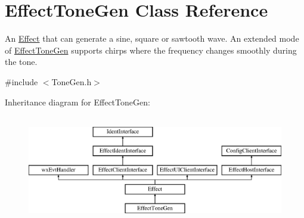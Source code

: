 \hypertarget{class_effect_tone_gen}{}\section{Effect\+Tone\+Gen Class Reference}
\label{class_effect_tone_gen}


An \hyperlink{class_effect}{Effect} that can generate a sine, square or sawtooth wave. An extended mode of \hyperlink{class_effect_tone_gen}{Effect\+Tone\+Gen} supports \textquotesingle{}chirps\textquotesingle{} where the frequency changes smoothly during the tone.  




{\ttfamily \#include $<$Tone\+Gen.\+h$>$}

Inheritance diagram for Effect\+Tone\+Gen\+:\begin{figure}[H]
\begin{center}
\leavevmode
\includegraphics[height=4.794520cm]{class_effect_tone_gen}
\end{center}
\end{figure}
